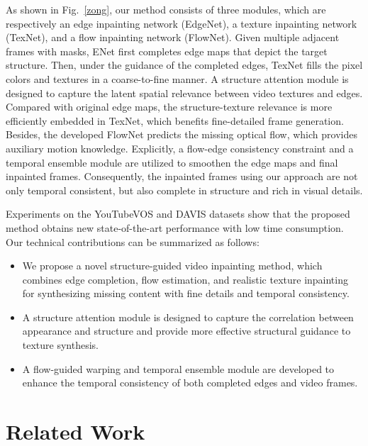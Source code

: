 As shown in Fig.~\ref{zong}, our method consists of three modules, which are respectively an edge inpainting network (EdgeNet), a texture inpainting network (TexNet), and a flow inpainting network (FlowNet).
%
Given multiple adjacent frames with masks, ENet first completes edge maps that depict the target structure. 
Then, under the guidance of the completed edges, TexNet fills the pixel colors and textures in a coarse-to-fine manner.
A structure attention module is designed to capture the latent spatial relevance between video textures and edges.
Compared with original edge maps, the structure-texture relevance is more efficiently embedded in TexNet, which benefits fine-detailed frame generation.
Besides, the developed FlowNet predicts the missing optical flow, which provides auxiliary motion knowledge. 
Explicitly, a flow-edge consistency constraint and a temporal ensemble module are utilized to smoothen the edge maps and final inpainted frames. 
Consequently, the inpainted frames using our approach are not only temporal consistent, but also complete in structure and rich in visual details.
 

%
Experiments on the YouTubeVOS and DAVIS datasets show that the proposed method obtains new state-of-the-art performance with low time consumption.
%
Our technical contributions can be summarized as follows:
\begin{itemize}
	\item We propose a novel structure-guided video inpainting method, which combines edge completion, flow estimation, and realistic texture inpainting for synthesizing missing content with fine details and temporal consistency.
	\item A structure attention module is designed to capture the correlation between appearance and structure and provide more effective structural guidance to texture synthesis.
	\item A flow-guided warping and temporal ensemble module are developed to enhance the temporal consistency of both completed edges and video frames.   
\end{itemize}





\section{Related Work}
